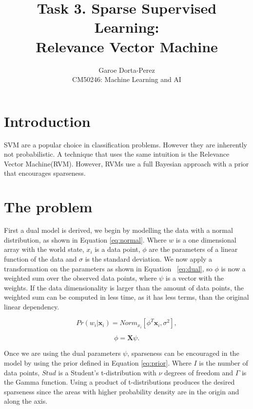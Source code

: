 \documentclass[12pt]{article}
\begin{document}
  
\title{Task 3. Sparse Supervised Learning:\\ Relevance Vector Machine}
\author{Garoe Dorta-Perez\\
CM50246: Machine Learning and AI}
 
\maketitle
 
\section{Introduction}
 
SVM  are a popular choice in classification problems.
However they are inherently not probabilistic.
A technique that uses the same intuition is the Relevance Vector Machine(RVM).
However, RVMs use a full Bayesian approach with a prior that encourages sparseness.

\section{The problem}

First a dual model is derived, we begin by modelling the data with a normal distribution, as shown in Equation \ref{eq:normal}.
Where $w$ is a one dimensional array with the world state, $x_i$ is a data point, $\phi$ are the parameters of a linear function of the data and $\sigma$ is the standard deviation.
We now apply a transformation on the parameters as shown in Equation ~\ref{eq:dual}, so $\phi$ is now a weighted sum over the observed data points, where $\psi$ is a vector with the weights.
If the data dimensionality is larger than the amount of data points, the weighted sum can be computed in less time, as it has less terms, than the original linear dependency.

\begin{equation}
\label{eq:normal}
Pr(w_i|\mathbf{x}_i) = Norm_{x_i}[\phi^T \mathbf{x}_i, \sigma^2],
\end{equation}

\begin{equation}
\label{eq:dual}
\phi = \mathbf{X} \psi.
\end{equation}

Once we are using the dual parameters $\psi$, sparseness can be encouraged in the model by using the prior defined in Equation \ref{eq:prior}.
Where $I$ is the number of data points, $Stud$ is a Student's t-distribution with $\nu$ degrees of freedom and $\Gamma$ is the Gamma function.
Using a product of t-distributions produces the desired sparseness since the areas with higher probability density are in the origin and along the axis.
\end{document}
